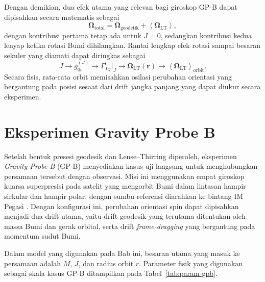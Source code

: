 Dengan demikian, dua efek utama yang relevan bagi giroskop GP-B dapat
dipisahkan secara matematis sebagai
\begin{equation}
    \bm{\Omega}_{\mathrm{total}}
    =\bm{\Omega}_{\mathrm{geodetik}}
    +\left\langle\bm{\Omega}_{\mathrm{LT}}\right\rangle,
    \label{eq:omega-total}
\end{equation}
dengan kontribusi pertama tetap ada untuk $J=0$, sedangkan kontribusi kedua
lenyap ketika rotasi Bumi dihilangkan. Rantai lengkap efek rotasi sampai
besaran sekuler yang diamati dapat diringkas sebagai
\begin{equation}
    J
    \longrightarrow
    g_{0i}^{(J)}
    \longrightarrow
    \Gamma^i_{\ 0j}\big|_J
    \longrightarrow
    \bm{\Omega}_{\mathrm{LT}}(\mathbf{r})
    \longrightarrow
    \left\langle\bm{\Omega}_{\mathrm{LT}}\right\rangle_{\mathrm{orbit}}.
    \label{eq:lt-secular-chain}
\end{equation}
Secara fisis, rata-rata orbit memisahkan osilasi perubahan orientasi yang
bergantung pada posisi sesaat dari drift jangka panjang yang dapat diukur
secara eksperimen.


\section{Eksperimen Gravity Probe B}
\label{sec:gravity-probe-b}

Setelah bentuk presesi geodesik dan Lense--Thirring diperoleh, eksperimen
\textit{Gravity Probe B} (GP-B) menyediakan kasus uji langsung untuk
menghubungkan persamaan tersebut dengan observasi. Misi ini menggunakan
empat giroskop kuarsa superpresisi pada satelit yang mengorbit Bumi dalam
lintasan hampir sirkular dan hampir polar, dengan sumbu referensi diarahkan
ke bintang IM Pegasi \parencite{Turneaure1986GravityProbeBApproach,Everitt2011GravityProbeB}.
Dengan konfigurasi ini, perubahan orientasi spin dapat dipisahkan menjadi
dua drift utama, yaitu drift geodesik yang terutama ditentukan oleh massa
Bumi dan gerak orbital, serta drift \textit{frame-dragging} yang bergantung
pada momentum sudut Bumi.

Dalam model yang digunakan pada Bab ini, besaran utama yang masuk ke
persamaan adalah $M$, $J$, dan radius orbit $r$. Parameter fisik yang
digunakan sebagai skala kasus GP-B ditampilkan pada
Tabel~\ref{tab:param-gpb}.

